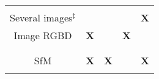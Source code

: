 \begin{landscape}
\begin{table}
{\begin{tabular}{|c | c | c | c | c |}
          \citep{Aubry2014,Mason2011,Russell2011} \\
            \hhline{-||-|-|-|-|}
            Several images$^{\ddagger}$	& \citep{Weyand2016,Zamir2010}		& \citep{Brubaker2016} & \citep{Kroeger2014}								& \textbf{X} \\
            \hhline{-||-|-|-|-|}
            Image RGBD			& \textbf{X}						& \textbf{\citep{Christie2016}}						& \textbf{X}								&
            \diagbox[dir=SW]
            {\makecell{
            		\citep{Cavallari,Gee2012,Glocker2013} \\
            		\citep{Glocker2015,Guzman-rivera2014,Shotton2013} \\
            		\citep{Valentin2015,Sizikova2016}
            }}
            {
			 \citep{Fernandez-Moral2013,Salas-Moreno2013}
			 } \\
            \hhline{-||-|-|-|-|}
            SfM				& \textbf{X}						& \textbf{X}						& \citep{Middelberg2014} \textbf{\citep{Lu2015}}				& \textbf{X} \\
            \hhline{-||-|-|-|-|}
	\end{tabular}
	}
\end{table}
\end{landscape}